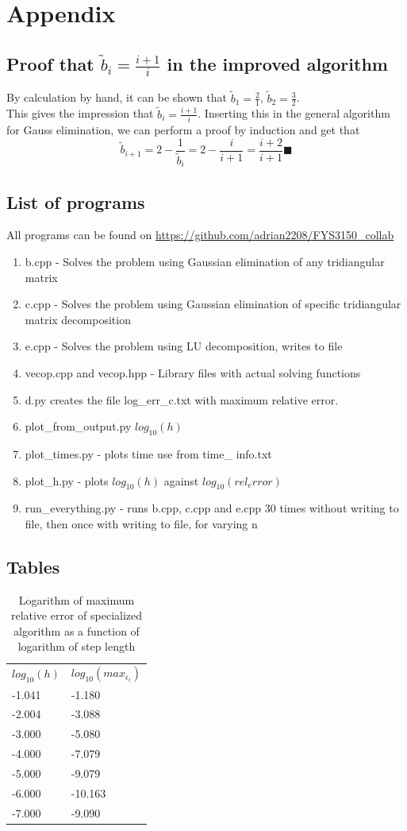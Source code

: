 \documentclass[10pt,a4paper]{article}
\begin{document}
\section{Appendix}
\subsection{Proof that $\tilde{b}_i=\frac{i+1}{i}$ in the improved algorithm}
By calculation by hand, it can be shown that  $\tilde{b}_1=\frac{2}{1}$,  $\tilde{b}_2=\frac{3}{2}$.\\
This gives the impression that  $\tilde{b}_i=\frac{i+1}{i}$.
Inserting this in the general algorithm for Gauss elimination, we can perform a proof by induction and get that
 $$\tilde{b}_{i+1}=2-\frac{1}{\tilde{b}_{i}}=2-\frac{i}{i+1}=\frac{i+2}{i+1} \blacksquare$$
\subsection{List of programs}
All programs can be found on \url{https://github.com/adrian2208/FYS3150_collab}
\begin{enumerate}
\item b.cpp - Solves the problem using Gaussian elimination of any tridiangular matrix
\item c.cpp - Solves the problem using Gaussian elimination of specific tridiangular matrix decomposition
\item e.cpp - Solves the problem using LU decomposition, writes to file
\item vecop.cpp and vecop.hpp - Library files with actual solving functions
\item d.py creates the file log\_err\_c.txt with maximum relative error.
\item plot\_from\_output.py $log_{10}(h)$
\item plot\_times.py - plots time use from time\_
info.txt
\item plot\_h.py - plots $log_{10}(h)$ against $log_{10}(rel_error)$
\item run\_everything.py - runs b.cpp, c.cpp and e.cpp 30 times without writing to file, then once with writing to file, for varying n
\end{enumerate}
\subsection{Tables}
\begin{table}[H]
\caption[Relative error of specialized algorithm]{Logarithm of maximum relative error of specialized algorithm as a function of logarithm of step length}
\begin{tabular}{ll}
$log_{10}(h)$ &  $log_{10}(max_{\epsilon_i})$ \\
 -1.041 & -1.180 \\
 -2.004 & -3.088 \\
 -3.000 & -5.080 \\
 -4.000 & -7.079 \\
 -5.000 & -9.079 \\
 -6.000 & -10.163 \\
 -7.000 & -9.090 

\end{tabular}
\end{table}
\end{document}
